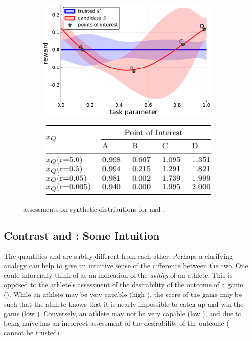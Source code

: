 \begin{figure}[tbp]
    \centering
    \begin{subfigure}[c]{0.65\linewidth}
        \centering
        \includegraphics[width=0.7\linewidth]{Figures/p1.pdf}
        \vfill
    \end{subfigure}%
    \hfill
    \begin{subfigure}[t]{0.35\linewidth}
        \centering
        \includegraphics[width=1.0\linewidth]{Figures/p1_table.pdf}
    \end{subfigure} 
    \caption{\xQ{} assessments on synthetic \pri{} distributions for \solvetrust{} and \solvecand{}.}
    \label{fig:sq_thry1}
\end{figure}

\subsection{Contrast \xQ{} and \xO{}: Some Intuition}
The quantities \xQ{} and \xO{} are subtly different from each other. Perhaps a clarifying analogy can help to give an intuitive sense of the difference between the two. One could informally think of \xQ{} as an indication of the \emph{ability} of an athlete. This is opposed to the athlete's assessment of the desirability of the outcome of a game (\xO). While an athlete may be very capable (high \xQ), the score of the game may be such that the athlete knows that it is nearly impossible to catch up and win the game (low \xO). Conversely, an athlete may not be very capable (low \xQ), and due to being na\"{i}ve has an incorrect assessment of the desirability of the outcome (\xO{} cannot be trusted).

